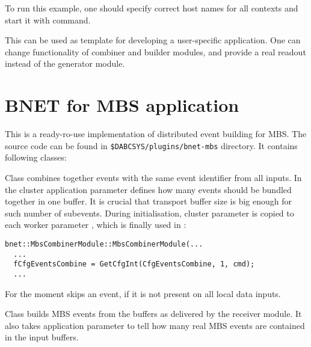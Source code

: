 To run this example, one should specify correct host names for all contexts and 
start it with  command.      

This can be used as template for developing a user-specific application.
One can change functionality of combiner and builder modules, and provide a 
real readout instead of the generator module. 


\section{BNET for MBS application}

This is a ready-ro-use implementation of distributed event building for MBS.
The source code can be found in {\tt \$DABCSYS/plugins/bnet-mbs} directory.
It contains following classes:
\bbul
\item  {}
\item  {}
\item  {}
\item  {}
\ebul

Class  combines together  
events with the same event identifier from all inputs. 
In the cluster application parameter  defines how many
events should be bundled together in one buffer. It is crucial that transport
buffer size is big enough for such number of subevents. During initialisation,
cluster parameter   is copied to each
worker parameter , which is finally used in : 
   
\begin{small}
\begin{verbatim}
bnet::MbsCombinerModule::MbsCombinerModule(...  
  ...
  fCfgEventsCombine = GetCfgInt(CfgEventsCombine, 1, cmd);
  ...
\end{verbatim}
\end{small}

For the moment  skips an event, 
if it is not present on all local data inputs. 

Class  builds MBS events from
the buffers as delivered by the receiver module. It also takes 
application parameter  to tell how many real MBS events
are contained in the input buffers.
  
